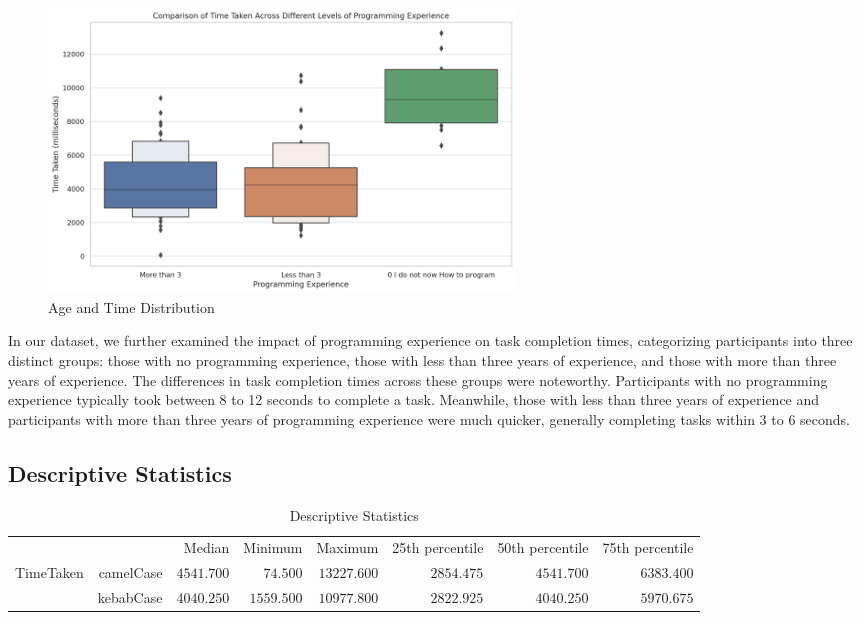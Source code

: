 \documentclass{article}
\begin{document}
\begin{figure}[H]
    \centering
    \includegraphics[width=0.6\textwidth]{programming_experience.png}
    \caption{Age and Time Distribution}
\end{figure}

In our dataset, we further examined the impact of programming experience on task completion times, categorizing participants into three distinct groups: those with no programming experience, those with less than three years of experience, and those with more than three years of experience. The differences in task completion times across these groups were noteworthy. Participants with no programming experience typically took between 8 to 12 seconds to complete a task. Meanwhile, those with less than three years of experience and participants with more than three years of programming experience were much quicker, generally completing tasks within 3 to 6 seconds.



\subsection{Descriptive Statistics}



\begin{table}[h]
	\centering
	\caption{Descriptive Statistics}
	\label{tab:descriptiveStatistics}
	{
		\begin{tabular}{lrrrrrrr}
			\toprule
			 &  & Median & Minimum & Maximum & 25th percentile & 50th percentile & 75th percentile  \\
			\cmidrule[0.4pt]{1-8}
			TimeTaken & camelCase & $4541.700$ & $74.500$ & $13227.600$ & $2854.475$ & $4541.700$ & $6383.400$  \\
			 & kebabCase & $4040.250$ & $1559.500$ & $10977.800$ & $2822.925$ & $4040.250$ & $5970.675$  \\
			\bottomrule
		\end{tabular}
	}
\end{table}
\end{document}

